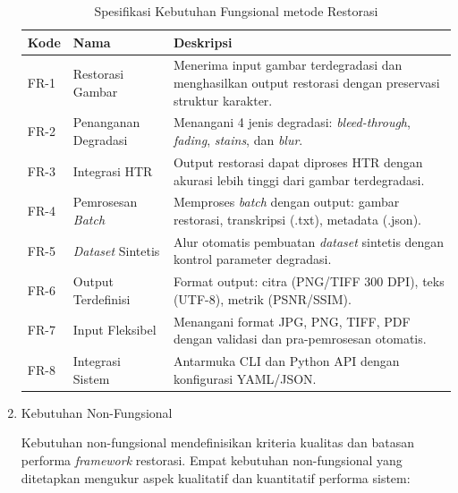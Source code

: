 \documentclass[12pt,a4paper]{article}
\begin{document}
\begin{enumerate}[label=\arabic*., leftmargin=*]
\begin{table}[htbp!]
    \centering
    \small
    \caption{Spesifikasi Kebutuhan Fungsional metode Restorasi}
    \label{tab:functional_requirements}
    \begin{tabular}{p{}p{}p{}}
        \toprule
        \textbf{Kode} & \textbf{Nama}        & \textbf{Deskripsi}                                                                                        \\
        \midrule
        FR-1          & Restorasi Gambar     & Menerima input gambar terdegradasi dan menghasilkan output restorasi dengan preservasi struktur karakter. \\
        \midrule
        FR-2          & Penanganan Degradasi & Menangani 4 jenis degradasi: \textit{bleed-through}, \textit{fading}, \textit{stains}, dan \textit{blur}. \\
        \midrule
        FR-3          & Integrasi HTR        & Output restorasi dapat diproses HTR dengan akurasi lebih tinggi dari gambar terdegradasi.                 \\
        \midrule
        FR-4          & Pemrosesan \textit{Batch}     & Memproses \textit{batch} dengan output: gambar restorasi, transkripsi (.txt), metadata (.json).                    \\
        \midrule
        FR-5          & \textit{Dataset} Sintetis     & Alur otomatis pembuatan \textit{dataset} sintetis dengan kontrol parameter degradasi.                              \\
        \midrule
        FR-6          & Output Terdefinisi   & Format output: citra (PNG/TIFF 300 DPI), teks (UTF-8), metrik (PSNR/SSIM).                                \\
        \midrule
        FR-7          & Input Fleksibel      & Menangani format JPG, PNG, TIFF, PDF dengan validasi dan pra-pemrosesan otomatis.                         \\
        \midrule
        FR-8          & Integrasi Sistem     & Antarmuka CLI dan Python API dengan konfigurasi YAML/JSON.                                                \\
        \bottomrule
    \end{tabular}
\end{table}



\item Kebutuhan Non-Fungsional

Kebutuhan non-fungsional mendefinisikan kriteria kualitas dan batasan performa \textit{framework} restorasi. Empat kebutuhan non-fungsional yang ditetapkan mengukur aspek kualitatif dan kuantitatif performa sistem:


\end{enumerate}
\end{document}
